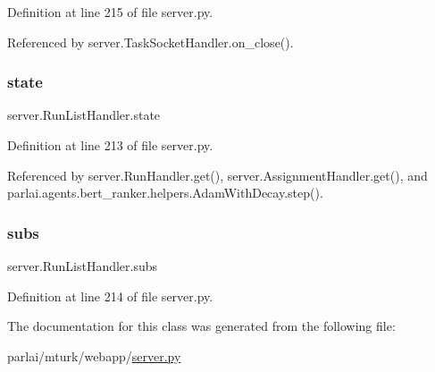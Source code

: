 Definition at line 215 of file server.\+py.



Referenced by server.\+Task\+Socket\+Handler.\+on\+\_\+close().

\mbox{\label{classserver_1_1RunListHandler_ae88e56eec799ca7da0bd28968b0c6c7f}} 
\subsubsection{\texorpdfstring{state}{state}}
{\footnotesize\ttfamily server.\+Run\+List\+Handler.\+state}



Definition at line 213 of file server.\+py.



Referenced by server.\+Run\+Handler.\+get(), server.\+Assignment\+Handler.\+get(), and parlai.\+agents.\+bert\+\_\+ranker.\+helpers.\+Adam\+With\+Decay.\+step().

\mbox{\label{classserver_1_1RunListHandler_a72cf46887c9c9dc3df88b5099019770d}} 
\subsubsection{\texorpdfstring{subs}{subs}}
{\footnotesize\ttfamily server.\+Run\+List\+Handler.\+subs}



Definition at line 214 of file server.\+py.



The documentation for this class was generated from the following file\+:\begin{DoxyCompactItemize}
\item 
parlai/mturk/webapp/\hyperlink{server_8py}{server.\+py}\end{DoxyCompactItemize}
